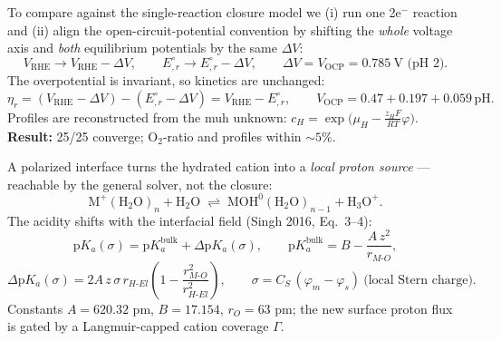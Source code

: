 \documentclass[11pt]{article}
\newcommand{\Eeq}{E^{\circ}}
\newcommand{\VRHE}{V_{\mathrm{RHE}}}
\newcommand{\CS}{C_{S}}
\begin{document}
\begin{tcolorbox}[cardstyle={Slide 18 --- Agreement with prior work (closure reproduction)}]
To compare against the single-reaction closure model we (i) run one
2e$^-$ reaction and (ii) align the open-circuit-potential convention by
shifting the \emph{whole} voltage axis and \emph{both} equilibrium
potentials by the same $\Delta V$:
\[
  \VRHE \to \VRHE - \Delta V,\qquad \Eeq_{,r}\to \Eeq_{,r} - \Delta V,
  \qquad \Delta V = V_{\mathrm{OCP}} = 0.785~\text{V (pH 2)}.
\]
The overpotential is invariant, so kinetics are unchanged:
\[
  \eta_r = (\VRHE-\Delta V) - (\Eeq_{,r}-\Delta V) = \VRHE - \Eeq_{,r},
  \qquad
  V_{\mathrm{OCP}} = 0.47 + 0.197 + 0.059\,\mathrm{pH}.
\]
Profiles are reconstructed from the muh unknown:
$c_H = \exp\!\big(\mu_H - \tfrac{z_H F}{RT}\varphi\big)$.
\textbf{Result:} 25/25 converge; O$_2$-ratio and profiles within $\sim5\%$.
\end{tcolorbox}

\begin{tcolorbox}[cardstyle={Slide 20 --- Tentative: cation hydrolysis (field-shifted p$K_a$)}]
A polarized interface turns the hydrated cation into a \emph{local proton
source} --- reachable by the general solver, not the closure:
\[
  \mathrm{M^+(H_2O)}_n + \mathrm{H_2O}
  \;\rightleftharpoons\;
  \mathrm{MOH^0(H_2O)}_{n-1} + \mathrm{H_3O^+}.
\]
The acidity shifts with the interfacial field (Singh 2016, Eq.~3--4):
\[
  \mathrm{p}K_a(\sigma) = \mathrm{p}K_a^{\mathrm{bulk}} + \Delta \mathrm{p}K_a(\sigma),
  \qquad
  \mathrm{p}K_a^{\mathrm{bulk}} = B - \frac{A\,z^2}{r_{M\text{-}O}},
\]
\[
  \Delta \mathrm{p}K_a(\sigma)
   = 2A\,z\,\sigma\,r_{H\text{-}El}\!\left(1 - \frac{r_{M\text{-}O}^2}{r_{H\text{-}El}^2}\right),
  \qquad
  \sigma = \CS\,(\varphi_m - \varphi_s)\ \text{(local Stern charge)}.
\]
Constants $A=620.32$ pm, $B=17.154$, $r_O=63$ pm; the new surface proton
flux is gated by a Langmuir-capped cation coverage $\Gamma$.
\end{tcolorbox}
\end{document}
